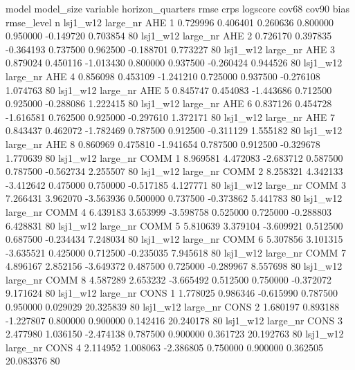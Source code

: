        model model_size variable  horizon_quarters      rmse      crps   logscore    cov68    cov90      bias  rmse_level  n
    lsj1_w12   large_nr      AHE                 1  0.729996  0.406401   0.260636 0.800000 0.950000 -0.149720    0.703854 80
    lsj1_w12   large_nr      AHE                 2  0.726170  0.397835  -0.364193 0.737500 0.962500 -0.188701    0.773227 80
    lsj1_w12   large_nr      AHE                 3  0.879024  0.450116  -1.013430 0.800000 0.937500 -0.260424    0.944526 80
    lsj1_w12   large_nr      AHE                 4  0.856098  0.453109  -1.241210 0.725000 0.937500 -0.276108    1.074763 80
    lsj1_w12   large_nr      AHE                 5  0.845747  0.454083  -1.443686 0.712500 0.925000 -0.288086    1.222415 80
    lsj1_w12   large_nr      AHE                 6  0.837126  0.454728  -1.616581 0.762500 0.925000 -0.297610    1.372171 80
    lsj1_w12   large_nr      AHE                 7  0.843437  0.462072  -1.782469 0.787500 0.912500 -0.311129    1.555182 80
    lsj1_w12   large_nr      AHE                 8  0.860969  0.475810  -1.941654 0.787500 0.912500 -0.329678    1.770639 80
    lsj1_w12   large_nr     COMM                 1  8.969581  4.472083  -2.683712 0.587500 0.787500 -0.562734    2.255507 80
    lsj1_w12   large_nr     COMM                 2  8.258321  4.342133  -3.412642 0.475000 0.750000 -0.517185    4.127771 80
    lsj1_w12   large_nr     COMM                 3  7.266431  3.962070  -3.563936 0.500000 0.737500 -0.373862    5.441783 80
    lsj1_w12   large_nr     COMM                 4  6.439183  3.653999  -3.598758 0.525000 0.725000 -0.288803    6.428831 80
    lsj1_w12   large_nr     COMM                 5  5.810639  3.379104  -3.609921 0.512500 0.687500 -0.234434    7.248034 80
    lsj1_w12   large_nr     COMM                 6  5.307856  3.101315  -3.635521 0.425000 0.712500 -0.235035    7.945618 80
    lsj1_w12   large_nr     COMM                 7  4.896167  2.852156  -3.649372 0.487500 0.725000 -0.289967    8.557698 80
    lsj1_w12   large_nr     COMM                 8  4.587289  2.653232  -3.665492 0.512500 0.750000 -0.372072    9.171624 80
    lsj1_w12   large_nr     CONS                 1  1.778025  0.986346  -0.615990 0.787500 0.950000  0.029029   20.325839 80
    lsj1_w12   large_nr     CONS                 2  1.680197  0.893188  -1.227807 0.800000 0.900000  0.142416   20.240178 80
    lsj1_w12   large_nr     CONS                 3  2.477980  1.036150  -2.474138 0.787500 0.900000  0.361723   20.192763 80
    lsj1_w12   large_nr     CONS                 4  2.114952  1.008063  -2.386805 0.750000 0.900000  0.362505   20.083376 80
